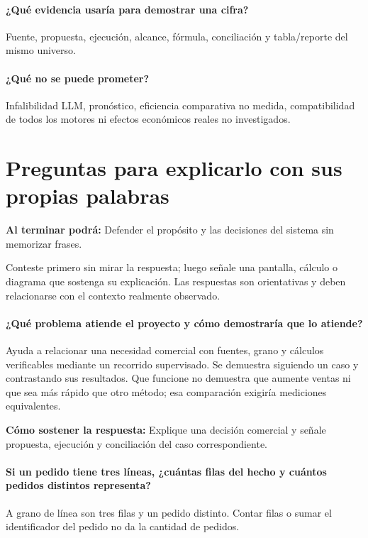\paragraph{¿Qué evidencia usaría para demostrar una cifra?} Fuente, propuesta, ejecución, alcance, fórmula, conciliación y tabla/reporte del mismo universo.

\paragraph{¿Qué no se puede prometer?} Infalibilidad LLM, pronóstico, eficiencia comparativa no medida, compatibilidad de todos los motores ni efectos económicos reales no investigados.


\section{Preguntas para explicarlo con sus propias palabras}
\textbf{Al terminar podrá:} Defender el propósito y las decisiones del sistema sin memorizar frases.

Conteste primero sin mirar la respuesta; luego señale una pantalla, cálculo o diagrama que sostenga su explicación. Las respuestas son orientativas y deben relacionarse con el contexto realmente observado.

\paragraph{¿Qué problema atiende el proyecto y cómo demostraría que lo atiende?} Ayuda a relacionar una necesidad comercial con fuentes, grano y cálculos verificables mediante un recorrido supervisado. Se demuestra siguiendo un caso y contrastando sus resultados. Que funcione no demuestra que aumente ventas ni que sea más rápido que otro método; esa comparación exigiría mediciones equivalentes.

\textbf{Cómo sostener la respuesta:} Explique una decisión comercial y señale propuesta, ejecución y conciliación del caso correspondiente.

\paragraph{Si un pedido tiene tres líneas, ¿cuántas filas del hecho y cuántos pedidos distintos representa?} A grano de línea son tres filas y un pedido distinto. Contar filas o sumar el identificador del pedido no da la cantidad de pedidos.

